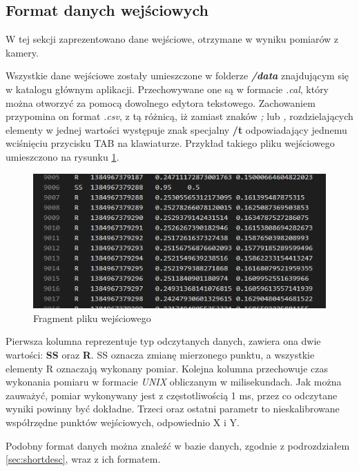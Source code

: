 \subsection{Format danych wejściowych}
\label{ssec:importdata}
W tej sekcji zaprezentowano dane wejściowe, otrzymane w wyniku pomiarów z kamery.\par
Wszystkie dane wejściowe zostały umieszczone w folderze \emph{\textbf{/data}} znajdującym się w katalogu głównym aplikacji. Przechowywane one są w formacie \emph{.cal}, który można otworzyć za pomocą dowolnego edytora tekstowego. Zachowaniem przypomina on format \emph{.csv}, z tą różnicą, iż zamiast znaków \emph{;} lub \emph{,} rozdzielających elementy w jednej wartości występuje znak specjalny \textbf{/t} odpowiadający jednemu wciśnięciu przycisku TAB na klawiaturze. Przykład takiego pliku wejściowego umieszczono na rysunku \ref{fig:plikwejsciowy}.
\begin{figure}[H]
        \centering
        \captionsetup{justification=centering,margin=2cm}
        \includegraphics[width=0.8\linewidth]{resources/plikwejsciowy.png}
        \caption{Fragment pliku wejściowego}
        \label{fig:plikwejsciowy}
\end{figure}
Pierwsza kolumna reprezentuje typ odczytanych danych, zawiera ona dwie wartości: \textbf{SS} oraz \textbf{R}. SS oznacza zmianę mierzonego punktu, a wszystkie elementy R oznaczają wykonany pomiar. Kolejna kolumna przechowuje czas wykonania pomiaru w formacie \emph{UNIX} obliczanym w milisekundach. Jak można zauważyć, pomiar wykonywany jest z częstotliwością 1 ms, przez co odczytane wyniki powinny być dokładne. Trzeci oraz ostatni parametr to nieskalibrowane współrzędne punktów wejściowych, odpowiednio X i Y.\par
Podobny format danych można znaleźć w bazie danych, zgodnie z podrozdziałem \ref{sec:shortdesc}, wraz z ich formatem.
